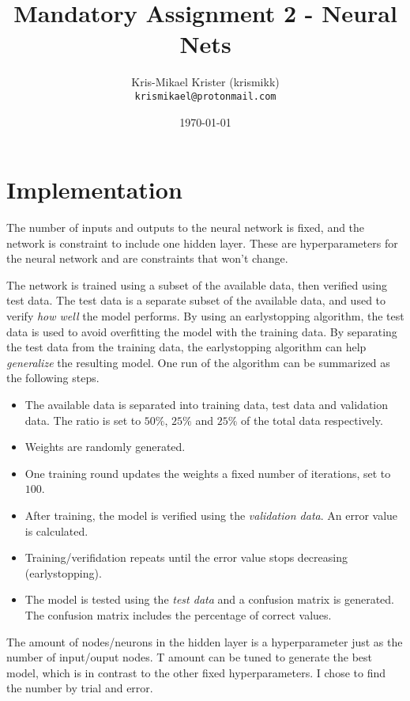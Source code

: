 \documentclass{article}
\title{Mandatory Assignment 2 - Neural Nets}
\author{Kris-Mikael Krister (krismikk)\\\texttt{krismikael@protonmail.com}}
\date{\today}
\begin{document}
\maketitle

\section*{Implementation}

The number of inputs and outputs to the neural network is fixed, and the network is constraint to include one hidden layer. These are hyperparameters for the neural network and are constraints that won't change.

The network is trained using a subset of the available data, then verified using test data. The test data is a separate subset of the available data, and used to verify \emph{how well} the model performs. By using an earlystopping algorithm, the test data is used to avoid overfitting the model with the training data. By separating the test data from the training data, the earlystopping algorithm can help \emph{generalize} the resulting model. One run of the algorithm can be summarized as the following steps.

\begin{itemize}
    \item The available data is separated into training data, test data and validation data. The ratio is set to $50\%$, $25\%$ and $25\%$ of the total data respectively.
    \item Weights are randomly generated.
    \item One training round updates the weights a fixed number of iterations, set to $100$.
    \item After training, the model is verified using the \emph{validation data}. An error value is calculated.
    \item Training/verifidation repeats until the error value stops decreasing (earlystopping).
    \item The model is tested using the \emph{test data} and a confusion matrix is generated. The confusion matrix includes the percentage of correct values.
\end{itemize}

\noindent The amount of nodes/neurons in the hidden layer is a hyperparameter just as the number of input/ouput nodes. T amount can be tuned to generate the best model, which is in contrast to the other fixed hyperparameters. I chose to find the number by trial and error.
\end{document}
